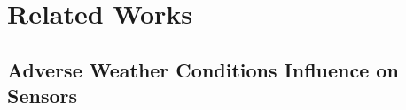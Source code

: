 \documentclass[report.tex]{subfiles}
\begin{document}
    \chapter{Related Works}

    \section{Adverse Weather Conditions Influence on Sensors}



\end{document}
